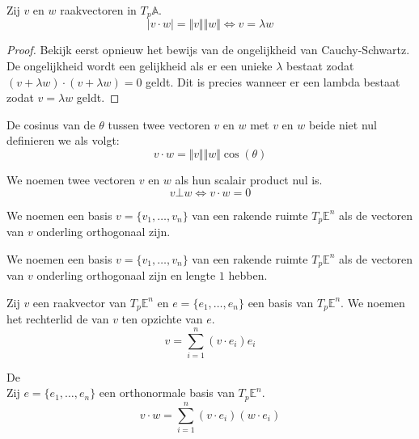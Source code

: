 \documentclass[main.tex]{subfiles}
\begin{document}
\begin{ei}
  Zij $v$ en $w$ raakvectoren in $T_{p}\mathbb{A}$.
  \[ |v \cdot w| = \Vert v \Vert \Vert w \Vert \Leftrightarrow v = \lambda w \]

  \begin{proof}
    Bekijk eerst opnieuw het bewijs van de ongelijkheid van Cauchy-Schwartz.
    De ongelijkheid wordt een gelijkheid als er een unieke $\lambda$ bestaat zodat $(v+\lambda w) \cdot (v + \lambda w) = 0$ geldt.
    Dit is precies wanneer er een lambda bestaat zodat $v=\lambda w$ geldt.
  \end{proof}
\end{ei}

\begin{de}
  De cosinus van de  $\theta$ tussen twee vectoren $v$ en $w$ met $v$ en $w$ beide niet nul definieren we als volgt:
  \[ v \cdot w = \Vert v \Vert \Vert w \Vert \cos(\theta) \]
\end{de}

\begin{de}
  We noemen twee vectoren $v$ en $w$  als hun scalair product nul is.
  \[ v \bot w \Leftrightarrow v \cdot w = 0 \]
\end{de}

\begin{de}
  We noemen een basis $v = \{ v_{1}, \dotsc, v_{n} \}$ van een rakende ruimte $T_{p}\mathbb{E}^{n}$  als de vectoren van $v$ onderling orthogonaal zijn.
\end{de}

\begin{de}
  We noemen een basis $v = \{ v_{1}, \dotsc, v_{n} \}$ van een rakende ruimte $T_{p}\mathbb{E}^{n}$  als de vectoren van $v$ onderling orthogonaal zijn en lengte $1$ hebben.
\end{de}

\begin{st}
  Zij $v$ een raakvector van $T_{p}\mathbb{E}^{n}$ en $e = \{ e_{1}, \dotsc, e_{n} \}$ een basis van $T_{p}\mathbb{E}^{n}$.
  We noemen het rechterlid de  van $v$ ten opzichte van $e$.
  \[ v = \sum_{i=1}^{n} (v \cdot e_{i})e_{i} \]
\end{st}

\begin{gev}
  \label{gev:identiteit-van-parseval}
  De \\
  Zij $e = \{e_{1},\dotsc,e_{n}\}$ een orthonormale basis van $T_{p}\mathbb{E}^{n}$. 
  \[ v \cdot w = \sum_{i=1}^{n}(v \cdot e_{i})(w \cdot e_{i})\]
\end{gev}
\end{document}
